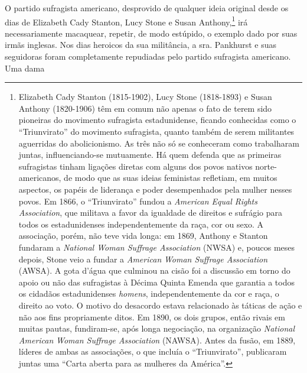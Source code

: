 O partido sufragista americano, desprovido de qualquer ideia original
desde os dias de Elizabeth Cady Stanton, Lucy Stone e Susan
Anthony,\footnote{Elizabeth Cady Stanton (1815-1902), Lucy Stone
  (1818-1893) e Susan Anthony (1820-1906) têm em comum não apenas o fato
  de terem sido pioneiras do movimento sufragista estadunidense, ficando
  conhecidas como o ``Triunvirato'' do movimento sufragista, quanto
  também de serem militantes aguerridas do abolicionismo. As três não só
  se conheceram como trabalharam juntas, influenciando-se mutuamente. Há
  quem defenda que as primeiras sufragistas tinham ligações diretas com
  alguns dos povos nativos norte-americanos, de modo que as suas ideias
  feministas refletiam, em muitos aspectos, os papéis de liderança e
  poder desempenhados pela mulher nesses povos. Em 1866, o
  ``Triunvirato'' fundou a \emph{American Equal Rights Association}, que
  militava a favor da igualdade de direitos e sufrágio para todos os
  estadunidenses independentemente da raça, cor ou sexo. A associação,
  porém, não teve vida longa: em 1869, Anthony e Stanton fundaram a
  \emph{National Woman Suffrage Association} (NWSA) e, poucos meses
  depois, Stone veio a fundar a \emph{American} \emph{Woman Suffrage
  Association} (AWSA). A gota d'água que culminou na cisão foi a
  discussão em torno do apoio ou não das sufragistas à Décima Quinta
  Emenda que garantia a todos os cidadãos estadunidenses \emph{homens},
  independentemente da cor e raça, o direito ao voto. O motivo do
  desacordo estava relacionado às táticas de ação e não aos fins
  propriamente ditos. Em 1890, os dois grupos, então rivais em muitas
  pautas, fundiram-se, após longa negociação, na organização
  \emph{National American} \emph{Woman Suffrage Association} (NAWSA).
  Antes da fusão, em 1889, líderes de ambas as associações, o que
  incluía o ``Triunvirato'', publicaram juntas uma ``Carta aberta para
  as mulheres da América''.} irá necessariamente macaquear, repetir, de
modo estúpido, o exemplo dado por suas irmãs inglesas. Nos dias heroicos
da sua militância, a sra. Pankhurst e suas seguidoras foram
completamente repudiadas pelo partido sufragista americano. Uma dama
